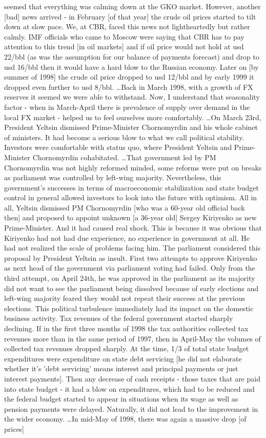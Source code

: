 seemed that everything was calming down at the GKO market. However, another [bad] news arrived - in February [of that year] the crude oil prices started to tilt down at slow pace. We, at CBR, faced this news not lightheartedly but rather calmly. IMF officials who came to Moscow were saying that CBR has to pay attention to this trend [in oil markets] and if oil price would not hold at \ac{usd} 22/bbl (as was the assumption for our balance of payments forecast) and drop to \ac{usd} 16/bbl then it would have a hard blow to the Russian economy. Later on [by summer of 1998] the crude oil price dropped to \ac{usd} 12/bbl and by early 1999 it dropped even further to \ac{usd} 8/bbl. \dots Back in March 1998, with a growth of FX reserves it seemed we were able to withstand. Now, I understand that seasonality factor - when in March-April there is prevalence of supply over demand in the local FX market - helped us to feel ourselves more comfortably. \dots On March 23rd, President Yeltsin dismissed Prime-Minister Chornomyrdin and his whole cabinet of ministers. It had become a serious blow to what we call political stability. Investors were comfortable with status quo, where President Yeltsin and Prime-Minister Chornomyrdin cohabitated. \dots That government led by PM Chornomyrdin was not highly reformed minded, some reforms were put on breaks as parliament was controlled by left-wing majority. Nevertheless, this government's successes in terms of macroeconomic stabilization and state budget control in general allowed investors to look into the future with optimism. All in all, Yeltsin dismissed PM Chornomyrdin [who was a 60-year old official back then] and proposed to appoint unknown [a 36-year old] Sergey Kiriyenko as new Prime-Minister. And it had caused real shock. This is because it was obvious that Kiriyenko had not had due experience, no experience in government at all. He had not realized the scale of problems facing him. The parliament considered this proposal by President Yeltsin as insult. First two attempts to approve Kiriyenko as next head of the government via parliament voting had failed. Only from the third attempt, on April 24th, he was approved in the parliament as its majority did not want to see the parliament being dissolved because of early elections and left-wing majority feared they would not repeat their success at the previous elections. This political turbulence immediately had its impact on the domestic business activity. Tax revenues of the federal government started sharply declining. If in the first three months of 1998 the tax authorities collected tax revenues more than in the same period of 1997, then in April-May the volumes of collected tax revenues dropped sharply. At the time, 1/3 of total state budget expenditures were expenditure on state debt servicing [he did not elaborate whether it's 'debt servicing' means interest and principal payments or just interest payments]. Then any decrease of cash receipts - those taxes that are paid into state budget - it had a blow on expenditures, which had to be reduced and the federal budget started to appear in situations when its wage as well as pension payments were delayed. Naturally, it did not lead to the improvement in the wider economy. \dots In mid-May of 1998, there was again a massive drop [of prices] 